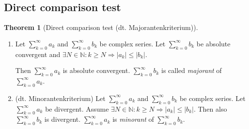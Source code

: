 \documentclass[a4paper,landscape,twocolumn]{article}
\theoremstyle{definition}
\newtheorem{theorem}{Theorem}
\newcommand\abs[1]{\left|#1\right|}
\begin{document}
\subsection{Direct comparison test}
\begin{theorem}[Direct comparison test (dt. \foreignlanguage{ngerman}{Majorantenkriterium})] \hfill{}
  \begin{enumerate}
    \item
      Let $\sum_{k=0}^\infty a_k$ and $\sum_{k=0}^\infty b_k$ be complex series.
      Let $\sum_{k=0}^\infty b_k$ be absolute convergent and $\exists N \in \mathbb N: k \geq N
      \Rightarrow \abs{a_k} \leq \abs{b_k}$.

      Then $\sum_{k=0}^\infty a_k$ is absolute convergent.
      $\sum_{k=0}^\infty b_k$ is called \emph{majorant} of $\sum_{k=0}^\infty a_k$.

    \item (dt. \foreignlanguage{ngerman}{Minorantenkriterium})
      Let $\sum_{k=0}^\infty a_k$ and $\sum_{k=0}^\infty b_k$ be complex series.
      Let $\sum_{k=0}^\infty a_k$ be divergent.
      Assume $\exists N \in \mathbb N: k \geq N \Rightarrow \abs{a_k} \leq \abs{b_k}$.
      Then also $\sum_{k=0}^\infty b_k$ is divergent.
      $\sum_{k=0}^\infty a_k$ is \emph{minorant} of $\sum_{k=0}^\infty b_k$.
  \end{enumerate}
\end{theorem}
\end{document}
